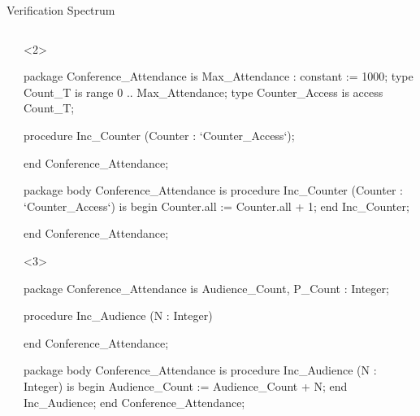 \documentclass{beamer}
\begin{document}
\begin{frame}[fragile]{Verification Spectrum}
\begin{columns}
\begin{column}{2cm}
    \end{column}

    \begin{column}{9cm}

      \begin{onlyenv}<2>
      \begin{pxcode}[language=SPARK,style=magic,gobble=8]
        package Conference_Attendance
        is
           Max_Attendance : constant := 1000;
           type Count_T is range 0 .. Max_Attendance;
           type Counter_Access is access Count_T;

           procedure Inc_Counter (Counter : `Counter_Access`);

        end Conference_Attendance;

        package body Conference_Attendance
        is
           procedure Inc_Counter (Counter : `Counter_Access`)
           is
           begin
              Counter.all := Counter.all + 1;
           end Inc_Counter;

        end Conference_Attendance;

      \end{pxcode}
      \end{onlyenv}

      \begin{onlyenv}<3>
      \begin{pxcode}[language=SPARK,style=magic,gobble=8]
        package Conference_Attendance
        is
           Audience_Count, P_Count : Integer;

           procedure Inc_Audience (N : Integer)

        end Conference_Attendance;

        package body Conference_Attendance
        is
           procedure Inc_Audience (N : Integer)
           is
           begin
              Audience_Count := Audience_Count + N;
           end Inc_Audience;
        end Conference_Attendance;
      \end{pxcode}
      \end{onlyenv}



\end{column}
\end{columns}
\end{frame}
\end{document}
